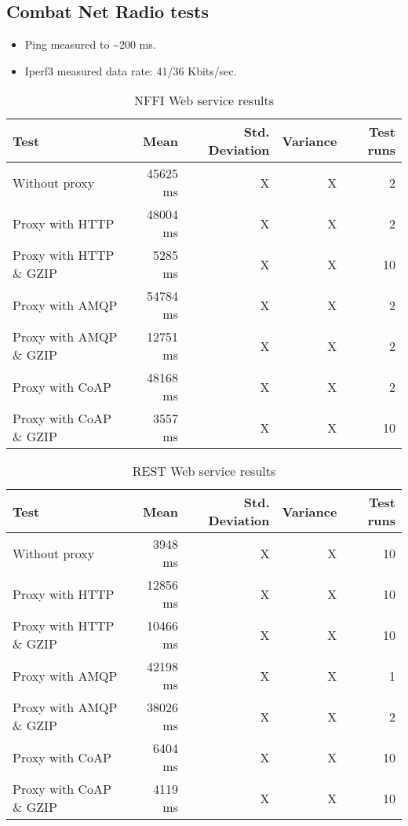 \begin{appendices}
\section{Combat Net Radio tests}

\begin{itemize}
	\item Ping measured to \textasciitilde 200 ms.
	\item Iperf3 measured data rate: 41/36 Kbits/sec.
\end{itemize}

\begin{table}[H]
\begin{tabular}{| l | r | r | r | r |}
\hline
  \textbf{Test} & \textbf{Mean} & \textbf{Std. Deviation} & \textbf{Variance} & \textbf{Test runs}\\ \hline
  Without proxy & 45625 ms & X & X & 2 \\ \hline
  Proxy with HTTP & 48004 ms & X & X & 2 \\ \hline
  Proxy with HTTP \& GZIP & 5285 ms & X & X & 10 \\ \hline
  Proxy with AMQP & 54784 ms & X & X & 2 \\ \hline
  Proxy with AMQP \& GZIP & 12751 ms & X & X & 2\\ \hline
  Proxy with CoAP & 48168 ms & X & X & 2 \\ \hline
  Proxy with CoAP \& GZIP & 3557 ms & X & X & 10 \\ \hline
\end{tabular}
\caption{NFFI Web service results}
\end{table}


\begin{table}[H]
\begin{tabular}{| l | r | r | r | r |}
\hline
  \textbf{Test} & \textbf{Mean} & \textbf{Std. Deviation} & \textbf{Variance} & \textbf{Test runs}\\ \hline
  Without proxy & 3948 ms & X & X & 10 \\ \hline
  Proxy with HTTP & 12856 ms & X & X & 10 \\ \hline
  Proxy with HTTP \& GZIP & 10466 ms & X & X & 10 \\ \hline
  Proxy with AMQP & 42198 ms & X & X & 1 \\ \hline
  Proxy with AMQP \& GZIP & 38026 ms & X & X & 2\\ \hline
  Proxy with CoAP & 6404 ms & X & X & 10 \\ \hline
  Proxy with CoAP \& GZIP & 4119 ms & X & X & 10 \\ \hline
\end{tabular}
\caption{REST Web service results}
\end{table}



\end{appendices}
